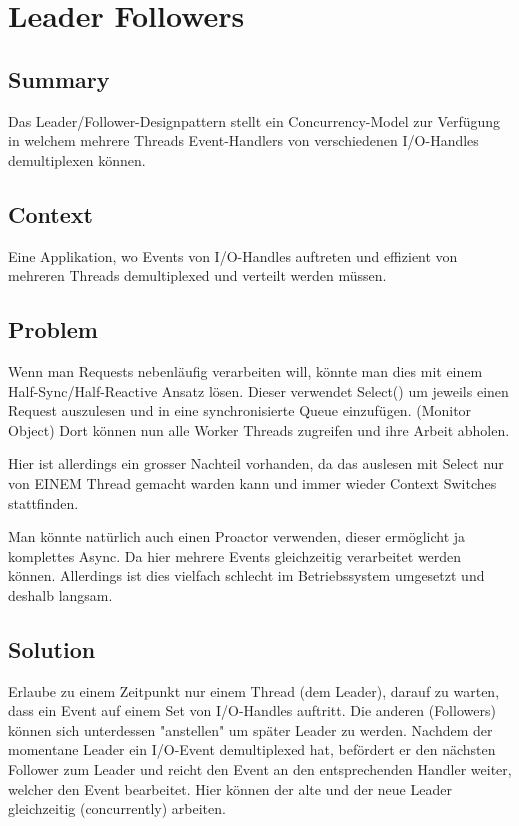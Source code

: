 \chapter{Leader Followers}

\section{Summary}
Das Leader/Follower-Designpattern stellt ein Concurrency-Model zur Verfügung in welchem mehrere Threads Event-Handlers von verschiedenen I/O-Handles demultiplexen können.

\section{Context}
Eine Applikation, wo Events von I/O-Handles auftreten und effizient von mehreren Threads demultiplexed und verteilt werden müssen.

\section{Problem}
Wenn man Requests nebenläufig verarbeiten will, könnte man dies mit einem Half-Sync/Half-Reactive Ansatz lösen. Dieser verwendet Select() um jeweils einen Request auszulesen und in eine synchronisierte Queue einzufügen. (Monitor Object) Dort können nun alle Worker Threads zugreifen und ihre Arbeit abholen.

Hier ist allerdings ein grosser Nachteil vorhanden, da das auslesen mit Select nur von EINEM Thread gemacht warden kann und immer wieder Context Switches stattfinden.

Man könnte natürlich auch einen Proactor verwenden, dieser ermöglicht ja komplettes Async. Da hier mehrere Events gleichzeitig verarbeitet werden können. Allerdings ist dies vielfach schlecht im Betriebssystem umgesetzt und deshalb langsam.

\section{Solution}
Erlaube zu einem Zeitpunkt nur einem Thread (dem Leader), darauf zu warten, dass ein Event auf einem Set von I/O-Handles auftritt. Die anderen (Followers) können sich unterdessen "anstellen" um später Leader zu werden. Nachdem der momentane Leader ein I/O-Event demultiplexed hat, befördert er den nächsten Follower zum Leader und reicht den Event an den entsprechenden Handler weiter, welcher den Event bearbeitet. Hier können der alte und der neue Leader gleichzeitig (concurrently) arbeiten.


